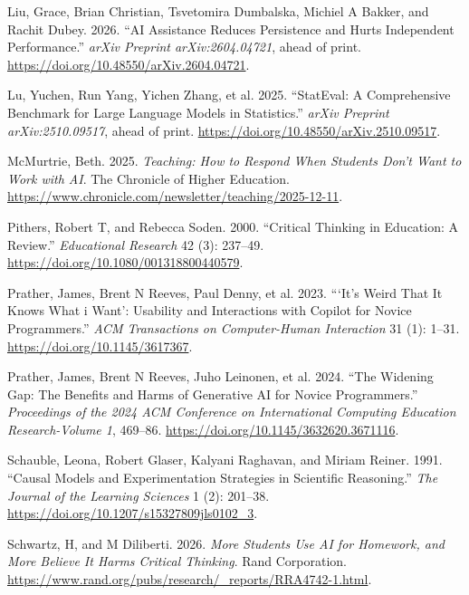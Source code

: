 \documentclass[
]{hdsr}
\newcounter{none} %
\newlength{\cslhangindent}
\newenvironment{CSLReferences}[2] %
 {\begin{list}{}{%
  \setlength{\itemindent}{0pt}
  \setlength{\leftmargin}{0pt}
  \setlength{\parsep}{0pt}
  \ifodd #1
   \setlength{\leftmargin}{\cslhangindent}
   \setlength{\itemindent}{-1\cslhangindent}
  \fi
  \setlength{\itemsep}{#2\baselineskip}}}
 {\end{list}}
\begin{document}
\begin{CSLReferences}{1}{1}
Liu, Grace, Brian Christian, Tsvetomira Dumbalska, Michiel A Bakker, and
Rachit Dubey. 2026. {``{AI} Assistance Reduces Persistence and Hurts
Independent Performance.''} \emph{arXiv Preprint arXiv:2604.04721},
ahead of print. \url{https://doi.org/10.48550/arXiv.2604.04721}.

{Lu, Yuchen, Run Yang, Yichen Zhang, et al.} 2025. {``{StatEval}: A
Comprehensive Benchmark for Large Language Models in Statistics.''}
\emph{arXiv Preprint arXiv:2510.09517}, ahead of print.
\url{https://doi.org/10.48550/arXiv.2510.09517}.

McMurtrie, Beth. 2025. \emph{Teaching: How to Respond When Students
Don't Want to Work with {AI}}. The Chronicle of Higher Education.
\url{https://www.chronicle.com/newsletter/teaching/2025-12-11}.

Pithers, Robert T, and Rebecca Soden. 2000. {``Critical Thinking in
Education: A Review.''} \emph{Educational Research} 42 (3): 237--49.
\url{https://doi.org/10.1080/001318800440579}.

Prather, James, Brent N Reeves, Paul Denny, et al. 2023. {``{`It's Weird
That It Knows What i Want'}: Usability and Interactions with Copilot for
Novice Programmers.''} \emph{ACM Transactions on Computer-Human
Interaction} 31 (1): 1--31. \url{https://doi.org/10.1145/3617367}.

Prather, James, Brent N Reeves, Juho Leinonen, et al. 2024. {``The
Widening Gap: The Benefits and Harms of Generative {AI} for Novice
Programmers.''} \emph{Proceedings of the 2024 ACM Conference on
International Computing Education Research-Volume 1}, 469--86.
\url{https://doi.org/10.1145/3632620.3671116}.

Schauble, Leona, Robert Glaser, Kalyani Raghavan, and Miriam Reiner.
1991. {``Causal Models and Experimentation Strategies in Scientific
Reasoning.''} \emph{The Journal of the Learning Sciences} 1 (2):
201--38. \url{https://doi.org/10.1207/s15327809jls0102_3}.

Schwartz, H, and M Diliberti. 2026. \emph{More Students Use {AI} for
Homework, and More Believe It Harms Critical Thinking}. Rand
Corporation.
\url{https://www.rand.org/pubs/research/_reports/RRA4742-1.html}.


\end{CSLReferences}
\end{document}
